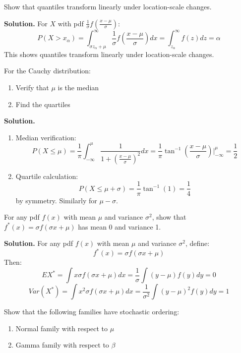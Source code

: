\begin{problembox}
Show that quantiles transform linearly under location-scale changes.
\end{problembox}

\noindent\textbf{Solution.}
For $X$ with pdf $\frac{1}{\sigma}f\left(\frac{x-\mu}{\sigma}\right)$:
\[
P(X > x_\alpha) = \int_{\sigma z_\alpha + \mu}^\infty \frac{1}{\sigma}f\left(\frac{x-\mu}{\sigma}\right)dx = \int_{z_\alpha}^\infty f(z)dz = \alpha
\]
This shows quantiles transform linearly under location-scale changes.

\begin{problembox}
For the Cauchy distribution:
\begin{enumerate}[label=(\alph*)]
\item Verify that $\mu$ is the median
\item Find the quartiles
\end{enumerate}
\end{problembox}

\noindent\textbf{Solution.}
\begin{enumerate}[label=(\alph*)]
\item Median verification:
\[
P(X \leq \mu) = \frac{1}{\pi}\int_{-\infty}^\mu \frac{1}{1+\left(\frac{x-\mu}{\sigma}\right)^2}dx = \frac{1}{\pi}\tan^{-1}\left(\frac{x-\mu}{\sigma}\right)\Big|_{-\infty}^\mu = \frac{1}{2}
\]

\item Quartile calculation:
\[
P(X \leq \mu + \sigma) = \frac{1}{\pi}\tan^{-1}(1) = \frac{1}{4}
\]
by symmetry. Similarly for $\mu - \sigma$.
\end{enumerate}

\begin{problembox}
For any pdf $f(x)$ with mean $\mu$ and variance $\sigma^2$, show that $f^*(x) = \sigma f(\sigma x + \mu)$ has mean 0 and variance 1.
\end{problembox}

\noindent\textbf{Solution.}
For any pdf $f(x)$ with mean $\mu$ and variance $\sigma^2$, define:
\[
f^*(x) = \sigma f(\sigma x + \mu)
\]
Then:
\[
EX^* = \int x\sigma f(\sigma x + \mu)dx = \frac{1}{\sigma}\int (y-\mu)f(y)dy = 0
\]
\[
Var(X^*) = \int x^2\sigma f(\sigma x + \mu)dx = \frac{1}{\sigma^2}\int (y-\mu)^2f(y)dy = 1
\]

\begin{problembox}
Show that the following families have stochastic ordering:
\begin{enumerate}[label=(\alph*)]
\item Normal family with respect to $\mu$
\item Gamma family with respect to $\beta$
\end{enumerate}
\end{problembox}

